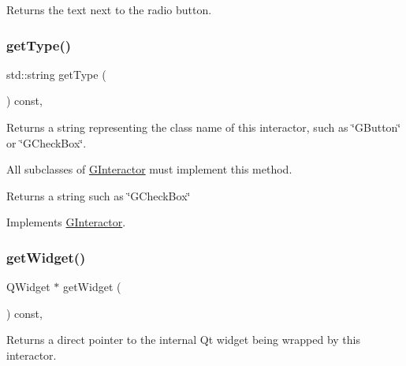 Returns the text next to the radio button. 

\mbox{\label{classsgl_1_1GRadioButton_a9b72ede4ee8520f987a0c01e30654814}} 
\subsubsection{\texorpdfstring{get\+Type()}{getType()}}
{\footnotesize\ttfamily std\+::string get\+Type (\begin{DoxyParamCaption}{ }\end{DoxyParamCaption}) const\hspace{0.3cm}{\ttfamily [override]}, {\ttfamily [virtual]}}



Returns a string representing the class name of this interactor, such as \char`\"{}\+G\+Button\char`\"{} or \char`\"{}\+G\+Check\+Box\char`\"{}. 

All subclasses of \mbox{\hyperlink{classsgl_1_1GInteractor}{G\+Interactor}} must implement this method. \begin{DoxyReturn}{Returns}
a string such as \char`\"{}\+G\+Check\+Box\char`\"{} 
\end{DoxyReturn}


Implements \mbox{\hyperlink{classsgl_1_1GInteractor_a44c407a54a20dd0f2fff30338289299d}{G\+Interactor}}.

\mbox{\label{classsgl_1_1GRadioButton_a3b33a602b31a6b809d020535a59db3b4}} 
\subsubsection{\texorpdfstring{get\+Widget()}{getWidget()}}
{\footnotesize\ttfamily Q\+Widget $\ast$ get\+Widget (\begin{DoxyParamCaption}{ }\end{DoxyParamCaption}) const\hspace{0.3cm}{\ttfamily [override]}, {\ttfamily [virtual]}}



Returns a direct pointer to the internal Qt widget being wrapped by this interactor. 

